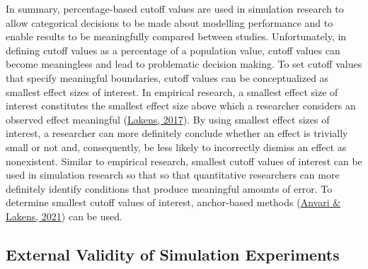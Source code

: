 \documentclass[
12pt, %
twoside,
english]{guelphthesis}
\begin{document}
In summary, percentage-based cutoff values are used in simulation research to allow categorical decisions to be made about modelling performance and to enable results to be meaningfully compared between studies. Unfortunately, in defining cutoff values as a percentage of a population value, cutoff values can become meaningless and lead to problematic decision making. To set cutoff values that specify meaningful boundaries, cutoff values can be conceptualized as smallest effect sizes of interest. In empirical research, a smallest effect size of interest constitutes the smallest effect size above which a researcher considers an observed effect meaningful (\protect\hyperlink{ref-lakens2017}{Lakens, 2017}). By using smallest effect sizes of interest, a researcher can more definitely conclude whether an effect is trivially small or not and, consequently, be less likely to incorrectly dismiss an effect as nonexistent. Similar to empirical research, smallest cutoff values of interest can be used in simulation research so that so that quantitative researchers can more definitely identify conditions that produce meaningful amounts of error. To determine smallest cutoff values of interest, anchor-based methods (\protect\hyperlink{ref-anvari2021}{Anvari \& Lakens, 2021}) can be used.

\hypertarget{external-validity-of-simulation-experiments}{%
\subsection{External Validity of Simulation Experiments}\label{external-validity-of-simulation-experiments}}
\end{document}
